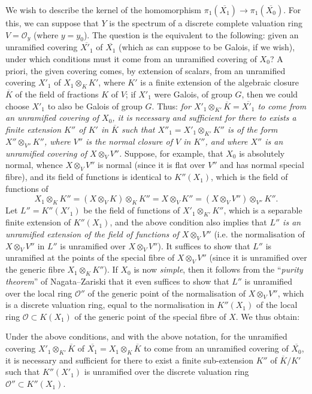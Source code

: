 \documentclass{article}
\theoremstyle{plain}
\newenvironment{corollary}[1]
  {\renewcommand\theinnercustomcorollary{#1}\innercustomcorollary}
  {\endinnercustomcorollary}
\theoremstyle{definition}
\newcommand{\sh}[1]{{\mathscr{#1}}}
\newcommand{\oldpage}[1]{\marginpar{\footnotesize$\Big\vert$ \textit{p.~#1}}}
\begin{document}
We wish to describe the kernel of the homomorphism $\pi_1(\overline{X_1})\to\pi_1(\overline{X_0})$.
For this, we can suppose that $Y$ is the spectrum of a discrete complete valuation ring $V=\sh{O}_y$ (where $y=y_0$).
The question is the equivalent to the following:
given an unramified covering $\overline{X'_1}$ of $\overline{X_1}$ (which as can suppose to be Galois, if we wish), under which conditions must it come from an unramified covering of $X_0$?
A priori, the given covering comes, by extension of scalars, from an unramified covering $X'_1$ of $X_1\otimes_KK'$, where $K'$ is a finite extension of the algebraic closure $\overline{K}$ of the field of fractions $K$ of $V$;
if $X'_1$ were Galois, of group $G$, then we could choose $X'_1$ to also be Galois of group $G$.
Thus: \emph{for $X'_1\otimes_{K'}\overline{K}=\overline{X'_1}$ to come from an unramified covering of $X_0$, it is necessary and sufficient for there to exists a finite extension $K''$ of $K'$ in $\overline{K}$ such that $X''_1=X'_1\otimes_{K'}K''$ is of the form $X''\otimes_{V''}K''$, where $V''$ is the normal closure of $V$ in $K''$, and where $X''$ is an unramified covering of $X\otimes_V V''$.}
Suppose, for example, that $X_0$ is absolutely normal, whence $X\otimes_V V''$ is normal (since it is flat over $V''$ and has normal special fibre), and its field of functions is identical to $K''(X_1)$, which is the field of functions of
\[
  X_1\otimes_K K'' = (X\otimes_VK)\otimes_KK'' = X\otimes_VK'' = (X\otimes_VV'')\otimes_{V''}K''.
\]
\oldpage{182-26}
Let $L''=K''(X'_1)$ be the field of functions of $X'_1\otimes_{K'}K''$, which is a separable finite extension of $K''(X_1)$, and the above condition also implies that \emph{$L''$ is an unramified extension of the field of functions of $X\otimes_VV''$} (i.e. the normalisation of $X\otimes_V V''$ in $L''$ is unramified over $X\otimes_VV''$).
It suffices to show that $L''$ is unramified at the points of the special fibre of $X\otimes_VV''$ (since it is unramified over the generic fibre $X_1\otimes_KK''$).
If $X_0$ is now \emph{simple}, then it follows from the ``\emph{purity theorem}'' of Nagata--Zariski that it even suffices to show that $L''$ is unramified over the local ring $\sh{O}''$ of the generic point of the normalisation of $X\otimes_VV''$, which is a discrete valuation ring, equal to the normalisation in $K''(X_1)$ of the local ring $\sh{O}\subset K(X_1)$ of the generic point of the special fibre of $X$.
We thus obtain:

\begin{corollary}{5}
\label{theorem12corollary5}
  Under the above conditions, and with the above notation, for the unramified covering $X'_1\otimes_{K'}\overline{K}$ of $\overline{X_1}=X_1\otimes_K\overline{K}$ to come from an unramified covering of $\overline{X_0}$, it is necessary and sufficient for there to exist a finite sub-extension $K''$ of $\overline{K}/K'$ such that $K''(X'_1)$ is unramified over the discrete valuation ring $\sh{O}''\subset K''(X_1)$.
\end{corollary}
\end{document}
